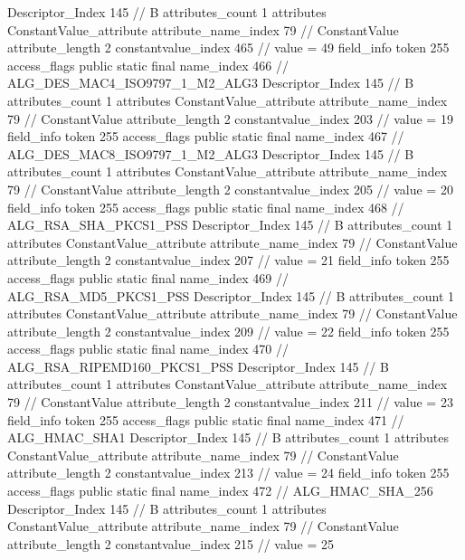 {{{{{				Descriptor_Index	145		// B
				attributes_count	1
				attributes {
				ConstantValue_attribute {
					attribute_name_index	79		// ConstantValue
					attribute_length	2
					constantvalue_index	465		// value = 49
				}
				}
			}
			field_info {
				token	255
				access_flags	public static final
				name_index	466		// ALG_DES_MAC4_ISO9797_1_M2_ALG3
				Descriptor_Index	145		// B
				attributes_count	1
				attributes {
				ConstantValue_attribute {
					attribute_name_index	79		// ConstantValue
					attribute_length	2
					constantvalue_index	203		// value = 19
				}
				}
			}
			field_info {
				token	255
				access_flags	public static final
				name_index	467		// ALG_DES_MAC8_ISO9797_1_M2_ALG3
				Descriptor_Index	145		// B
				attributes_count	1
				attributes {
				ConstantValue_attribute {
					attribute_name_index	79		// ConstantValue
					attribute_length	2
					constantvalue_index	205		// value = 20
				}
				}
			}
			field_info {
				token	255
				access_flags	public static final
				name_index	468		// ALG_RSA_SHA_PKCS1_PSS
				Descriptor_Index	145		// B
				attributes_count	1
				attributes {
				ConstantValue_attribute {
					attribute_name_index	79		// ConstantValue
					attribute_length	2
					constantvalue_index	207		// value = 21
				}
				}
			}
			field_info {
				token	255
				access_flags	public static final
				name_index	469		// ALG_RSA_MD5_PKCS1_PSS
				Descriptor_Index	145		// B
				attributes_count	1
				attributes {
				ConstantValue_attribute {
					attribute_name_index	79		// ConstantValue
					attribute_length	2
					constantvalue_index	209		// value = 22
				}
				}
			}
			field_info {
				token	255
				access_flags	public static final
				name_index	470		// ALG_RSA_RIPEMD160_PKCS1_PSS
				Descriptor_Index	145		// B
				attributes_count	1
				attributes {
				ConstantValue_attribute {
					attribute_name_index	79		// ConstantValue
					attribute_length	2
					constantvalue_index	211		// value = 23
				}
				}
			}
			field_info {
				token	255
				access_flags	public static final
				name_index	471		// ALG_HMAC_SHA1
				Descriptor_Index	145		// B
				attributes_count	1
				attributes {
				ConstantValue_attribute {
					attribute_name_index	79		// ConstantValue
					attribute_length	2
					constantvalue_index	213		// value = 24
				}
				}
			}
			field_info {
				token	255
				access_flags	public static final
				name_index	472		// ALG_HMAC_SHA_256
				Descriptor_Index	145		// B
				attributes_count	1
				attributes {
				ConstantValue_attribute {
					attribute_name_index	79		// ConstantValue
					attribute_length	2
					constantvalue_index	215		// value = 25
}}}}}}}

